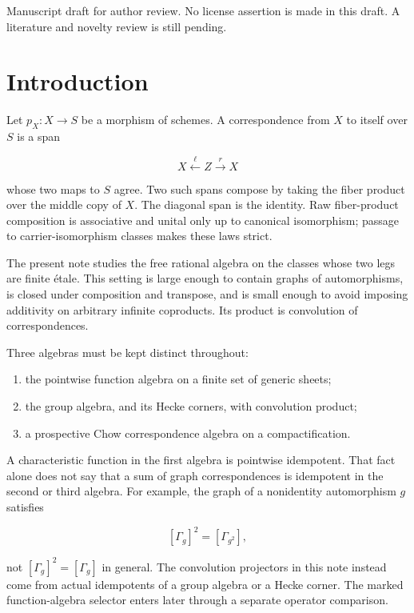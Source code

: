 \documentclass[11pt]{article}
\theoremstyle{definition}
\theoremstyle{remark}
\begin{document}
\begin{center}
  \small Manuscript draft for author review.  No license assertion is made
  in this draft.  A literature and novelty review is still pending.
\end{center}

\begingroup
\small
\tableofcontents
\endgroup

\section{Introduction}
\label{sec:introduction}

Let \(p_X:X\to S\) be a morphism of schemes.  A correspondence from \(X\)
to itself over \(S\) is a span

\[
  X \xleftarrow{\ell} Z \xrightarrow{r} X
\]

whose two maps to \(S\) agree.  Two such spans compose by taking the fiber
product over the middle copy of \(X\).  The diagonal span is the identity.
Raw fiber-product composition is associative and unital only up to canonical
isomorphism; passage to carrier-isomorphism classes makes these laws strict.

The present note studies the free rational algebra on the classes whose two
legs are finite \'etale.  This setting is large enough to contain graphs of
automorphisms, is closed under composition and transpose, and is small enough
to avoid imposing additivity on arbitrary infinite coproducts.  Its product
is convolution of correspondences.

Three algebras must be kept distinct throughout:

\begin{enumerate}[label=\textup{(\roman*)},leftmargin=2.6em]
  \item the pointwise function algebra on a finite set of generic sheets;
  \item the group algebra, and its Hecke corners, with convolution product;
  \item a prospective Chow correspondence algebra on a compactification.
\end{enumerate}

A characteristic function in the first algebra is pointwise idempotent.  That
fact alone does not say that a sum of graph correspondences is idempotent in
the second or third algebra.  For example, the graph of a nonidentity
automorphism \(g\) satisfies

\[
  [\Gamma_g]^2=[\Gamma_{g^2}],
\]

not \([\Gamma_g]^2=[\Gamma_g]\) in general.  The convolution projectors in
this note instead come from actual idempotents of a group algebra or a Hecke
corner.  The marked function-algebra selector enters later through a separate
operator comparison.
\end{document}
